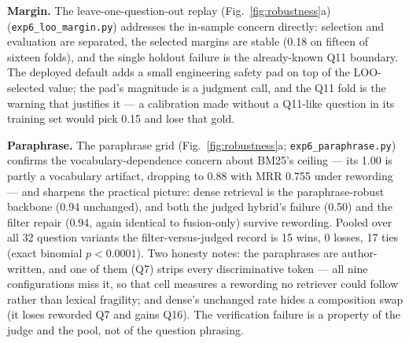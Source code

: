 \textbf{Margin.} The leave-one-question-out replay
(Fig.~\ref{fig:robustness}a)
(\texttt{exp6\_loo\_margin.py}) addresses the in-sample concern directly:
selection and evaluation are separated, the selected margins are stable
(0.18 on fifteen of sixteen folds), and the single holdout failure is the
already-known Q11 boundary. The deployed default adds a small engineering
safety pad on top of the LOO-selected value; the pad's magnitude is a
judgment call, and the Q11 fold is the warning that justifies it --- a
calibration made without a Q11-like question in its training set would
pick 0.15 and lose that gold.

\textbf{Paraphrase.} The paraphrase grid
(Fig.~\ref{fig:robustness}a; \texttt{exp6\_paraphrase.py})
confirms the vocabulary-dependence concern about BM25's ceiling --- its
1.00 is partly a vocabulary artifact, dropping to 0.88 with MRR 0.755
under rewording --- and sharpens the practical picture: dense retrieval is
the paraphrase-robust backbone (0.94 unchanged), and both the judged
hybrid's failure (0.50) and the filter repair (0.94, again identical to
fusion-only) survive rewording. Pooled over all 32 question variants the
filter-versus-judged record is 15 wins, 0 losses, 17 ties (exact binomial
$p < 0.0001$). Two honesty notes: the paraphrases are author-written, and
one of them (Q7) strips every discriminative token --- all nine
configurations miss it, so that cell measures a rewording no retriever
could follow rather than lexical fragility; and dense's unchanged rate
hides a composition swap (it loses reworded Q7 and gains Q16). The
verification failure is a property of
the judge and the pool, not of the question phrasing.

